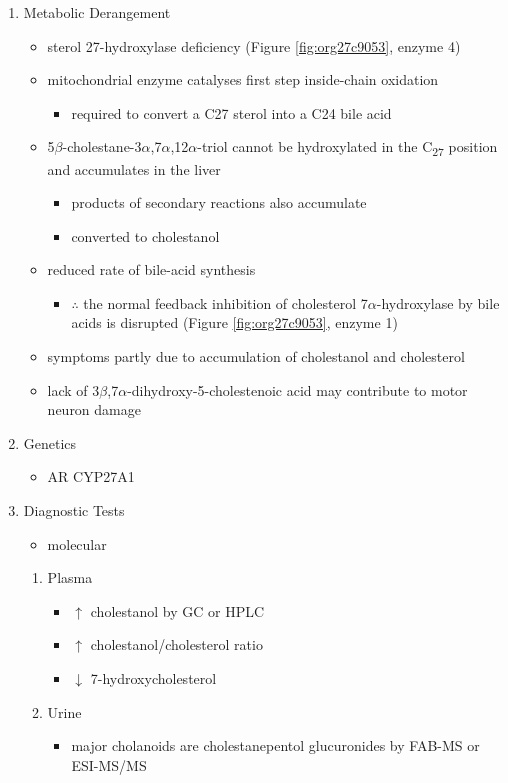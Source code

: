 \documentclass[12pt]{scrartcl}
\begin{document}
\begin{enumerate}
\item Metabolic Derangement
\label{sec:orgf592dbf}
\begin{itemize}
\item sterol 27-hydroxylase deficiency (Figure \ref{fig:org27c9053}, enzyme 4)
\item mitochondrial enzyme catalyses first step inside-chain oxidation
\begin{itemize}
\item required to convert a C27 sterol into a C24 bile acid
\end{itemize}
\item 5\(\beta\)-cholestane-3\(\alpha\),7\(\alpha\),12\(\alpha\)-triol cannot be hydroxylated in the C\textsubscript{27}
position and accumulates in the liver
\begin{itemize}
\item products of secondary reactions also accumulate
\item converted to cholestanol
\end{itemize}
\item reduced rate of bile-acid synthesis
\begin{itemize}
\item \(\therefore\) the normal feedback inhibition of cholesterol
7\(\alpha\)-hydroxylase by bile acids is disrupted (Figure \ref{fig:org27c9053}, enzyme 1)
\end{itemize}
\item symptoms partly due to accumulation of cholestanol and cholesterol
\item lack of 3\(\beta\),7\(\alpha\)-dihydroxy-5-cholestenoic acid may contribute to motor
neuron damage
\end{itemize}

\item Genetics
\label{sec:orgfdb7d43}
\begin{itemize}
\item AR CYP27A1
\end{itemize}
\item Diagnostic Tests
\label{sec:orgd1aabf3}
\begin{itemize}
\item molecular
\end{itemize}
\begin{enumerate}
\item Plasma
\label{sec:org927a905}
\begin{itemize}
\item \(\uparrow\) cholestanol by GC or HPLC
\item \(\uparrow\) cholestanol/cholesterol ratio
\item \(\downarrow\) 7-hydroxycholesterol
\end{itemize}
\item Urine
\label{sec:org9033dbb}
\begin{itemize}
\item major cholanoids are cholestanepentol glucuronides by FAB-MS or ESI-MS/MS
\end{itemize}
\end{enumerate}


\end{enumerate}
\end{document}
